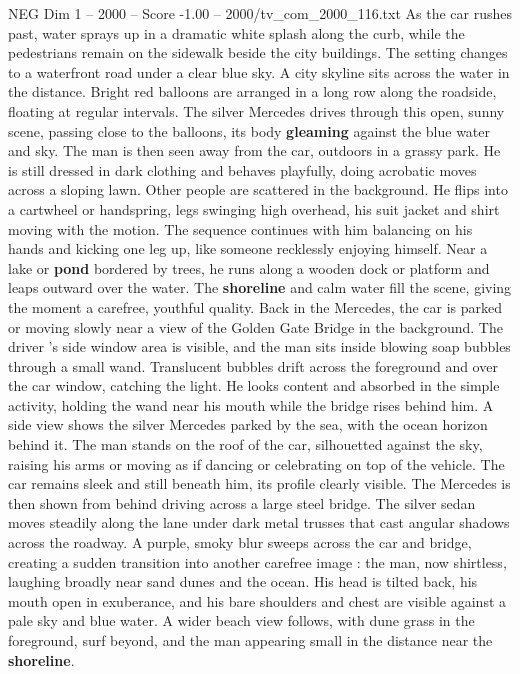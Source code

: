 \begin{textsample}{NEG Dim 1 – 2000 – Score -1.00 – 2000/tv\_com\_2000\_116.txt}
As the car rushes past, water sprays up in a dramatic white splash along the curb, while the pedestrians remain on the sidewalk beside the city buildings.
The setting changes to a waterfront road under a clear blue sky.
A city skyline sits across the water in the distance.
Bright red balloons are arranged in a long row along the roadside, floating at regular intervals.
The silver Mercedes drives through this open, sunny scene, passing close to the balloons, its body \textbf{gleaming} against the blue water and sky.
The man is then seen away from the car, outdoors in a grassy park.
He is still dressed in dark clothing and behaves playfully, doing acrobatic moves across a sloping lawn.
Other people are scattered in the background.
He flips into a cartwheel or handspring, legs swinging high overhead, his suit jacket and shirt moving with the motion.
The sequence continues with him balancing on his hands and kicking one leg up, like someone recklessly enjoying himself.
Near a lake or \textbf{pond} bordered by trees, he runs along a wooden dock or platform and leaps outward over the water.
The \textbf{shoreline} and calm water fill the scene, giving the moment a carefree, youthful quality.
Back in the Mercedes, the car is parked or moving slowly near a view of the Golden Gate Bridge in the background.
The driver ’s side window area is visible, and the man sits inside blowing soap bubbles through a small wand.
Translucent bubbles drift across the foreground and over the car window, catching the light.
He looks content and absorbed in the simple activity, holding the wand near his mouth while the bridge rises behind him.
A side view shows the silver Mercedes parked by the sea, with the ocean horizon behind it.
The man stands on the roof of the car, silhouetted against the sky, raising his arms or moving as if dancing or celebrating on top of the vehicle.
The car remains sleek and still beneath him, its profile clearly visible.
The Mercedes is then shown from behind driving across a large steel bridge.
The silver sedan moves steadily along the lane under dark metal trusses that cast angular shadows across the roadway.
A purple, smoky blur sweeps across the car and bridge, creating a sudden transition into another carefree image : the man, now shirtless, laughing broadly near sand dunes and the ocean.
His head is tilted back, his mouth open in exuberance, and his bare shoulders and chest are visible against a pale sky and blue water.
A wider beach view follows, with dune grass in the foreground, surf beyond, and the man appearing small in the distance near the \textbf{shoreline}.

\end{textsample}
